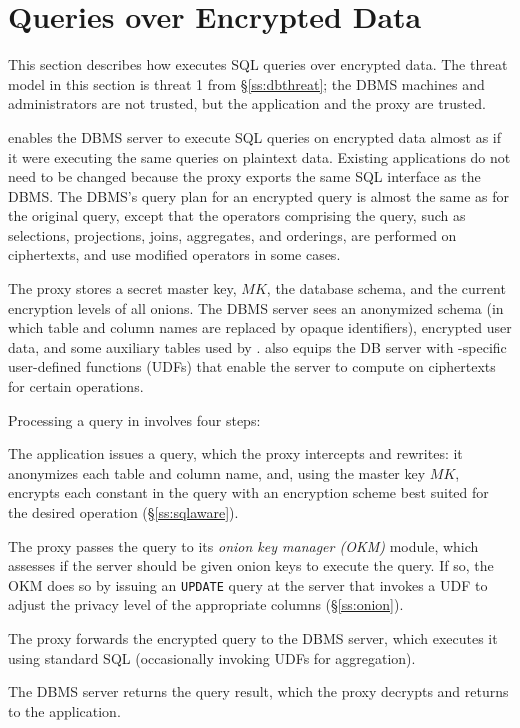 
\section{Queries over Encrypted Data}
\label{s:design}


This section describes how \name{} executes SQL queries over encrypted
data.  The threat model in this section is threat 1 from
\S\ref{ss:dbthreat}; the DBMS machines and administrators are not
trusted, but the application and the proxy are trusted.

\name{} enables the DBMS server to execute SQL queries on encrypted
data almost as if it were executing the same queries on plaintext
data. Existing applications do not need to be changed because the
proxy exports the same SQL interface as the DBMS\@. The DBMS's query
plan for an encrypted query is almost the same as for the original query,
except that the operators comprising the query, such as selections,
projections, joins, aggregates, and orderings, are performed on
ciphertexts, and use modified operators in some cases.

The \name{} proxy stores a secret master key, $\mathit{MK}$, the database
schema, and the current encryption levels of all onions.  The DBMS server
sees an anonymized schema (in which table and column names are replaced by
opaque identifiers), encrypted user
data, and some auxiliary tables used by \name{}.  \name{} also equips
the DB server with \name{}-specific user-defined functions (UDFs)
that enable the server to compute on ciphertexts for certain operations.

Processing a query in \name{} involves four steps:
\begin{CompactEnumerate}
\item The application issues a query, which the proxy intercepts and
  rewrites: it anonymizes each table and column name, and, using the
  master key $\mathit{MK}$, encrypts each constant in the query with an
  encryption scheme best suited for the desired operation
  (\S\ref{ss:sqlaware}).
\item The proxy passes the query to its {\em onion key manager (OKM)}
  module, which assesses if the server should be given onion keys to
  execute the query. If so, the OKM does so by issuing an
  \texttt{UPDATE} query at the server that invokes a UDF to adjust the
  privacy level of the appropriate columns (\S\ref{ss:onion}).
\item The proxy forwards the encrypted query to the DBMS server,
  which executes it using standard SQL (occasionally invoking 
  UDFs for aggregation).
\item The DBMS server returns the query result, which the proxy
  decrypts and returns to the application.
\end{CompactEnumerate}

